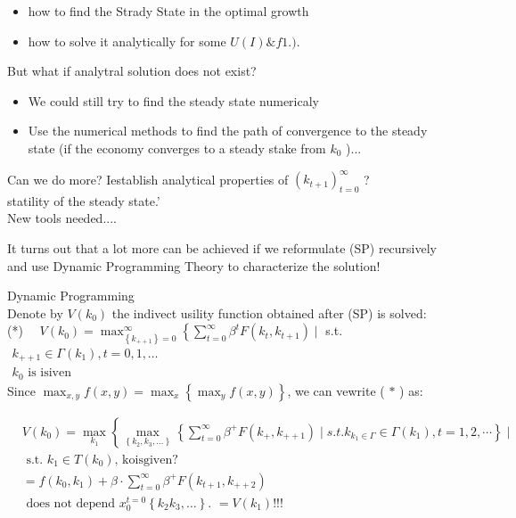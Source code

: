 \documentclass[10pt]{article}
\begin{document}
\begin{itemize}
  \item how to find the Strady State in the optimal growth
  \item how to solve it analytically for some $U(I) \& f 1$.$) .$
\end{itemize}

But what if analytral solution does not exist?

\begin{itemize}
  \item We could still try to find the steady state numericaly
  \item Use the numerical methods to find the path of convergence to the steady state (if the economy converges to a steady stake from $k_{0}$ )...
\end{itemize}

Can we do more? Iestablish analytical properties of $\left(k_{t+1}\right)_{t=0}^{\infty}$ ?\\
statility of the steady state.'\\
New tools needed....

It turns out that a lot more can be achieved if we reformulate (SP) recursively and use Dynamic Programming Theory to characterize the solution!

Dynamic Programming\\
Denote by $V\left(k_{0}\right)$ the indivect usility function obtained after (SP) is solved:\\
(*) $\quad V\left(k_{0}\right)=\max _{\left\{k_{++1}\right\}=0}^{\infty}\left\{\sum_{t=0}^{\infty} \beta^{t} F\left(k_{t}, k_{t+1}\right) \mid\right.$ s.t. $\begin{array}{l}k_{++1} \in \Gamma\left(k_{1}\right), t=0,1, \ldots \\ k_{0} \text { is isiven }\end{array}$\\
Since $\max _{x, y} f(x, y)=\max _{x}\left\{\max _{y} f(x, y)\right\}$, we can vewrite ( $*$ ) as:

$$
\begin{aligned}
& V\left(k_{0}\right)=\max _{k_{1}}\left\{\max _{\left\{k_{2}, k_{3}, \ldots\right\}}\left\{\sum_{t=0}^{\infty} \beta^{+} F\left(k_{+}, k_{++1}\right) \mid s . t . k_{k_{1} \in \Gamma} \in \Gamma\left(k_{1}\right), t=1,2, \cdots\right\} \mid\right. \\
& \text { s.t. } k_{1} \in T\left(k_{0}\right) \text {, koisgiven? } \\
& =f\left(k_{0}, k_{1}\right)+\beta \cdot \sum_{t=0}^{\infty} \beta^{+} F\left(k_{t+1}, k_{++2}\right) \\
& \text { does not depend } x_{0}^{t=0}\left\{k_{2} k_{3}, \ldots\right\} \text {. }=V\left(k_{1}\right)!!!
\end{aligned}
$$
\end{document}
